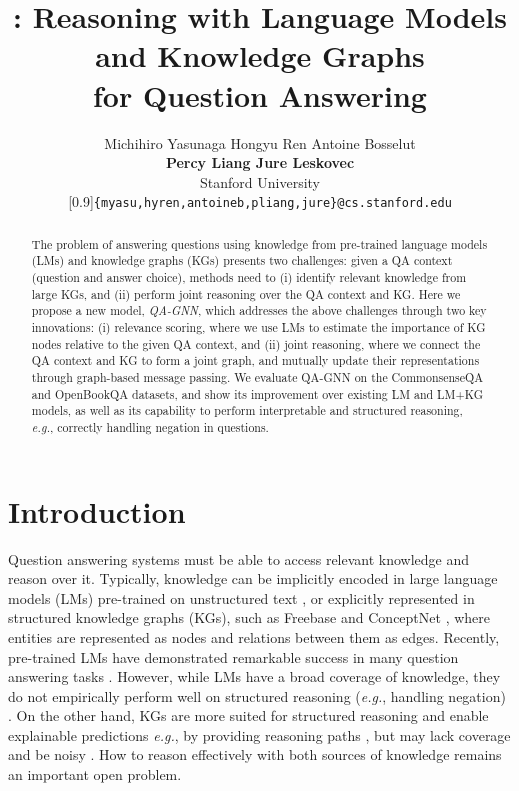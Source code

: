 \documentclass[11pt]{article}
\title{\methodname: Reasoning with Language Models and Knowledge Graphs \\ for Question Answering}
\author{Michihiro Yasunaga \quad Hongyu Ren \quad 
Antoine Bosselut\\{\bf Percy Liang \quad Jure Leskovec}\\
Stanford University\\
\scalebox{0.87}[0.9]{{\tt \{myasu,hyren,antoineb,pliang,jure\}@cs.stanford.edu}}}
\newcommand{\eg}{\textit{e.g.}}
\newcommand{\methodname}{QA-GNN\xspace}
\begin{document}
\setlength{\abovedisplayskip}{4pt}
\setlength{\belowdisplayskip}{4pt}


\maketitle


\begin{abstract} The problem of answering questions using knowledge from pre-trained language models (LMs) and knowledge graphs (KGs) presents two challenges:
given a QA context (question and answer choice), methods need to (i) identify relevant knowledge from large KGs, and (ii) perform joint reasoning over the QA context and KG.
Here we propose a new model, \textit{\methodname}, which addresses the above challenges through two key innovations:
(i) relevance scoring, where we use LMs to estimate the importance of KG nodes relative to the given QA context, 
and (ii) joint reasoning, where we connect the QA context and KG to form a joint graph, and mutually update their representations through graph-based message passing. 
We evaluate \methodname on the CommonsenseQA and OpenBookQA datasets, and show its improvement over existing LM and LM+KG models, as well as its capability to perform interpretable and structured reasoning, \eg, correctly handling negation in questions.
\end{abstract} \section{Introduction}\label{sec:intro}

Question answering systems must be able to access relevant knowledge and reason over it. Typically, knowledge can be implicitly encoded in large language models (LMs) pre-trained on unstructured text  \cite{petroni2019language,Bosselut2019COMETCT}, or explicitly represented in structured knowledge graphs (KGs), such as Freebase \cite{bollacker2008freebase} and ConceptNet \cite{speer2016conceptnet}, where entities are represented as nodes and relations between them as edges.
Recently, pre-trained LMs have demonstrated remarkable success in many question answering tasks \cite{liu2019roberta,t5}. However, while LMs have a broad coverage of knowledge, they do not empirically perform well on structured reasoning (\eg, handling negation) \cite{kassner2020negated}. On the other hand, KGs are more suited for structured reasoning \cite{ren2020query2box,ren2020beta} and enable explainable predictions \eg, by providing reasoning paths \cite{lin2019kagnet}, but may lack coverage and be noisy \cite{bordes2013translating,guu2015traversing}. How to reason effectively with both sources of knowledge remains an important open problem.
\end{document}
